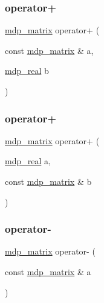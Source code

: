 \mbox{\label{classmdp__matrix_a2e4fb3c9d1e2be0e26120a1947eb895a}} 
\subsubsection{\texorpdfstring{operator+}{operator+}\hspace{0.1cm}{\footnotesize\ttfamily [5/6]}}
{\footnotesize\ttfamily \hyperlink{classmdp__matrix}{mdp\+\_\+matrix} operator+ (\begin{DoxyParamCaption}\item[{const \hyperlink{classmdp__matrix}{mdp\+\_\+matrix} \&}]{a,  }\item[{\hyperlink{mdp__global__vars_8h_a69d96b74c791e0bbdb888b3913a69450}{mdp\+\_\+real}}]{b }\end{DoxyParamCaption})\hspace{0.3cm}{\ttfamily [friend]}}

\mbox{\label{classmdp__matrix_ace32cb8f1638c0ff6917045e2d10f467}} 
\subsubsection{\texorpdfstring{operator+}{operator+}\hspace{0.1cm}{\footnotesize\ttfamily [6/6]}}
{\footnotesize\ttfamily \hyperlink{classmdp__matrix}{mdp\+\_\+matrix} operator+ (\begin{DoxyParamCaption}\item[{\hyperlink{mdp__global__vars_8h_a69d96b74c791e0bbdb888b3913a69450}{mdp\+\_\+real}}]{a,  }\item[{const \hyperlink{classmdp__matrix}{mdp\+\_\+matrix} \&}]{b }\end{DoxyParamCaption})\hspace{0.3cm}{\ttfamily [friend]}}

\mbox{\label{classmdp__matrix_a6861cfe08a2620bce0a79c2528721884}} 
\subsubsection{\texorpdfstring{operator-\/}{operator-}\hspace{0.1cm}{\footnotesize\ttfamily [1/6]}}
{\footnotesize\ttfamily \hyperlink{classmdp__matrix}{mdp\+\_\+matrix} operator-\/ (\begin{DoxyParamCaption}\item[{const \hyperlink{classmdp__matrix}{mdp\+\_\+matrix} \&}]{a }\end{DoxyParamCaption})\hspace{0.3cm}{\ttfamily [friend]}}

